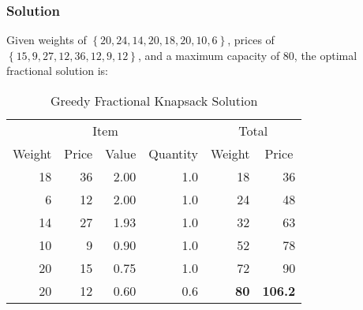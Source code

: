 \subsubsection*{Solution}

Given weights of $\left\{ 20, 24, 14, 20, 18, 20, 10, 6 \right\}$, prices of $\left\{ 15, 9, 27, 12, 36, 12, 9, 12 \right\}$, and a maximum capacity of $80$, the optimal fractional solution is:

\begin{table}[H]
\begin{center}
\begin{tabular}{rrrr||rr}
\multicolumn{4}{c||}{Item} & \multicolumn{2}{c}{Total} \\
\multicolumn{1}{c}{Weight} & \multicolumn{1}{c}{Price} & \multicolumn{1}{c}{Value} & \multicolumn{1}{c||}{Quantity} & \multicolumn{1}{c}{Weight} & \multicolumn{1}{c}{Price} \\
\hline
18 & 36 & 2.00 & 1.0 & 18 &  36 \\
 6 & 12 & 2.00 & 1.0 & 24 &  48 \\
14 & 27 & 1.93 & 1.0 & 32 &  63 \\
10 &  9 & 0.90 & 1.0 & 52 &  78 \\
20 & 15 & 0.75 & 1.0 & 72 &  90 \\
20 & 12 & 0.60 & 0.6 & \textbf{80} & \textbf{106.2} \\
\end{tabular}
\end{center}
\caption{Greedy Fractional Knapsack Solution}
\end{table}